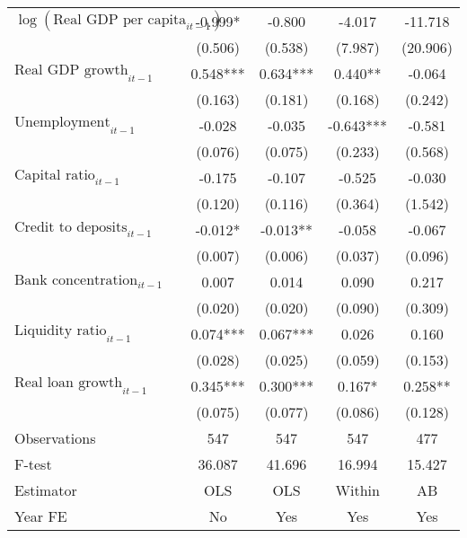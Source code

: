 \begin{longtable}{m{8cm}*{4}{c}}
$\log(\text{Real GDP per capita}_{it-1})$&      -0.999*  &      -0.800   &      -4.017   &     -11.718   \\
                    &     (0.506)   &     (0.538)   &     (7.987)   &    (20.906)   \\
$\text{Real GDP growth}_{it-1}$&       0.548***&       0.634***&       0.440** &      -0.064   \\
                    &     (0.163)   &     (0.181)   &     (0.168)   &     (0.242)   \\
$\text{Unemployment}_{it-1}$&      -0.028   &      -0.035   &      -0.643***&      -0.581   \\
                    &     (0.076)   &     (0.075)   &     (0.233)   &     (0.568)   \\
$\text{Capital ratio}_{it-1}$&      -0.175   &      -0.107   &      -0.525   &      -0.030   \\
                    &     (0.120)   &     (0.116)   &     (0.364)   &     (1.542)   \\
$\text{Credit to deposits}_{it-1}$&      -0.012*  &      -0.013** &      -0.058   &      -0.067   \\
                    &     (0.007)   &     (0.006)   &     (0.037)   &     (0.096)   \\
$\text{Bank concentration}_{it-1}$&       0.007   &       0.014   &       0.090   &       0.217   \\
                    &     (0.020)   &     (0.020)   &     (0.090)   &     (0.309)   \\
$\text{Liquidity ratio}_{it-1}$&       0.074***&       0.067***&       0.026   &       0.160   \\
                    &     (0.028)   &     (0.025)   &     (0.059)   &     (0.153)   \\
$\text{Real loan growth}_{it-1}$&       0.345***&       0.300***&       0.167*  &       0.258** \\
                    &     (0.075)   &     (0.077)   &     (0.086)   &     (0.128)   \\
\midrule
Observations        &         547   &         547   &         547   &         477   \\
F-test              &      36.087   &      41.696   &      16.994   &      15.427   \\
Estimator           &         OLS   &         OLS   &      Within   &          AB   \\
Year FE             &          No   &         Yes   &         Yes   &         Yes   \\

\end{longtable}
